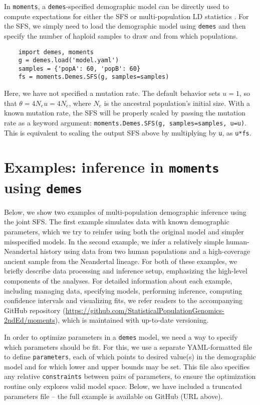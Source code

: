 \documentclass[]{article}
\newcommand{\moments}{\texttt{moments}\xspace}
\newcommand{\demes}{\texttt{demes}\xspace}
\begin{document}
In \moments, a \demes-specified demographic model can be directly used to
compute expectations for either the SFS or multi-population LD statistics
\cite{ragsdale2019models, ragsdale2020unbiased}. For the SFS, we simply need
to load the demographic model using \demes and then specify the number of
haploid samples to draw and from which populations.
\begin{verbatim}
    import demes, moments
    g = demes.load('model.yaml')
    samples = {'popA': 60, 'popB': 60}
    fs = moments.Demes.SFS(g, samples=samples)
\end{verbatim}
Here, we have not specified a mutation rate. The default behavior sets $u=1$,
so that $\theta = 4N_eu=4N_e$, where $N_e$ is the ancestral population's
initial size. With a known mutation rate, the SFS will be properly scaled by
passing the mutation rate as a keyword argument: \texttt{moments.Demes.SFS(g,
samples=samples, u=u)}. This is equivalent to scaling the output SFS above by
multiplying by \texttt{u}, as \texttt{u*fs}.

\section*{Examples: inference in \moments using \demes}

Below, we show two examples of multi-population demographic inference using the
joint SFS. The first example simulates data with known demographic parameters,
which we try to reinfer using both the original model and simpler
misspecified models. In the second example, we infer a relatively simple
human-Neandertal history using data from two human populations and a
high-coverage ancient sample from the Neandertal lineage. For both of these
examples, we briefly describe data processing and inference setup, emphasizing
the high-level components of the analyses. For detailed information about each
example, including managing data, specifying models, performing inference,
computing confidence intervals and visualizing fits, we refer readers to the
accompanying GitHub repository
(\url{https://github.com/StatisticalPopulationGenomics-2ndEd/moments}), which
is maintained with up-to-date versioning.

In order to optimize parameters in a \demes model, we need a way to specify
which parameters should be fit. For this, we use a separate YAML-formatted file
to define \texttt{parameters}, each of which points to desired value(s) in the
demographic model and for which lower and upper bounds may be set. This file
also specifies any relative \texttt{constraints} between pairs of parameters,
to ensure the optimization routine only explores valid model space. Below, we
have included a truncated parameters file -- the full example is available on
GitHub (URL above).
\end{document}
